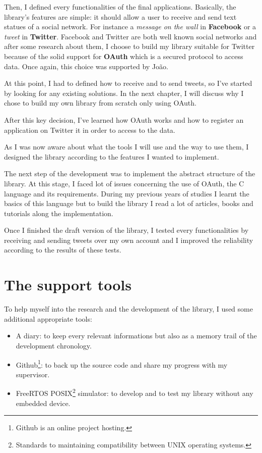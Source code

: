 Then, I defined every functionalities of the final applications. Basically, the library's features are simple: it should allow a user to receive and send text statues of a social network. For instance a \textit{message on the wall} in \textbf{Facebook} or a \textit{tweet} in \textbf{Twitter}. Facebook and Twitter are both well known social networks and after some research about them, I choose to build my library suitable for Twitter because of the solid support for \textbf{OAuth} which is a secured protocol to access data. Once again, this choice was supported by Jo\~{a}o.

At this point, I had to defined how to receive and to send tweets, so I've started by looking for any existing solutions. In the next chapter, I will discuss why I chose to build my own library from scratch only using OAuth.

After this key decision, I've learned how OAuth works and how to register an application on Twitter it in order to access to the data.

As I was now aware about what the tools I will use and the way to use them, I designed the library according to the features I wanted to implement.

The next step of the development was to implement the abstract structure of the library. At this stage, I faced lot of issues concerning the use of OAuth, the C language and its requirements. During my previous years of studies I learnt the basics of this language but to build the library I read a lot of articles, books and tutorials along the implementation.

Once I finished the draft version of the library, I tested every functionalities by receiving and sending tweets over my own account and I improved the reliability according to the results of these tests.



\section{The support tools}

\hspace{15mm}To help myself into the research and the development of the library, I used some additional appropriate tools:
\begin{itemize}
\item A diary: to keep every relevant informations but also as a memory trail of the development chronology.
\item Github\footnote{Github is an online project hosting.}: to back up the source code and share my progress with my supervisor.
\item FreeRTOS POSIX\footnote{Standards to maintaining compatibility between UNIX operating systems.} simulator: to develop and to test my library without any embedded device.
\end{itemize}

\clearpage
